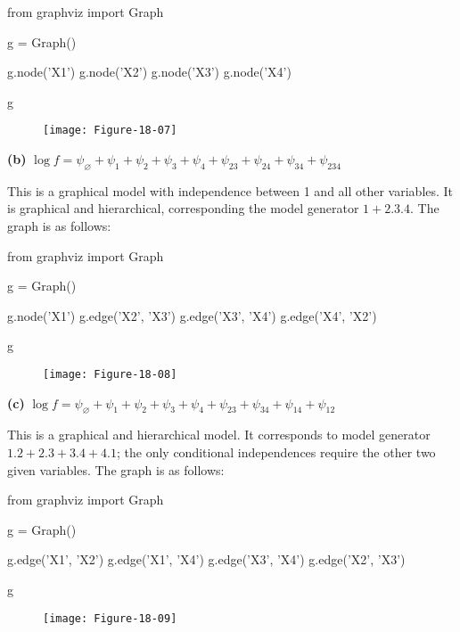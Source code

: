 \begin{python}
from graphviz import Graph

g = Graph()

g.node('X1')
g.node('X2')
g.node('X3')
g.node('X4')

g
\end{python}

\begin{figure}[H]
\texttt{[image: Figure-18-07]}
\end{figure}

\textbf{(b)}
\(\log f = \psi_\varnothing + \psi_1 + \psi_2 + \psi_3 + \psi_4 + \psi_{23} + \psi_{24} + \psi_{34} + \psi_{234}\)

This is a graphical model with independence between 1 and all other
variables. It is graphical and hierarchical, corresponding the model
generator \(1 + 2.3.4\). The graph is as follows:

\begin{python}
from graphviz import Graph

g = Graph()

g.node('X1')
g.edge('X2', 'X3')
g.edge('X3', 'X4')
g.edge('X4', 'X2')

g
\end{python}

\begin{figure}[H]
\texttt{[image: Figure-18-08]}
\end{figure}

\textbf{(c)}
\(\log f = \psi_\varnothing + \psi_1 + \psi_2 + \psi_3 + \psi_4 + \psi_{23} + \psi_{34} + \psi_{14} + \psi_{12}\)

This is a graphical and hierarchical model. It corresponds to model
generator \(1.2 + 2.3 + 3.4 + 4.1\); the only conditional independences
require the other two given variables. The graph is as follows:

\begin{python}
from graphviz import Graph

g = Graph()

g.edge('X1', 'X2')
g.edge('X1', 'X4')
g.edge('X3', 'X4')
g.edge('X2', 'X3')

g
\end{python}

\begin{figure}[H]
\texttt{[image: Figure-18-09]}
\end{figure}

